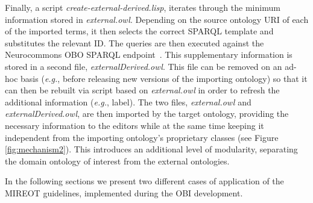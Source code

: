 \documentclass[jou]{ao2e}%
\begin{document}
Finally, a script \emph{create-external-derived.lisp}, iterates through the minimum information stored in \emph{external.owl}.
Depending on the source ontology URI of each of the imported terms, it then selects the correct SPARQL template and substitutes the relevant ID.
The queries are then executed against the Neurocommons OBO SPARQL endpoint~\citep{NeurocommonsSparql,Neurocommons}. This supplementary information is stored in a second file, \emph{externalDerived.owl}.
This file can be removed on an ad-hoc basis (\emph{e.g.}, before releasing new versions of the importing ontology) so that it can then be rebuilt via script based on \emph{external.owl} in order to refresh the additional information (\emph{e.g.}, label). The two files, \emph{external.owl} and \emph{externalDerived.owl}, are then imported by the target ontology, providing the necessary information to the editors while at the same time keeping it independent from the importing ontology's proprietary classes (see Figure \ref{fig:mechanism2}). This introduces an additional level of modularity, separating the domain ontology of interest from the external ontologies.%

In the following sections we present two different cases of application of the \ac{MIREOT} guidelines, implemented during the \ac{OBI} development.
\end{document}
